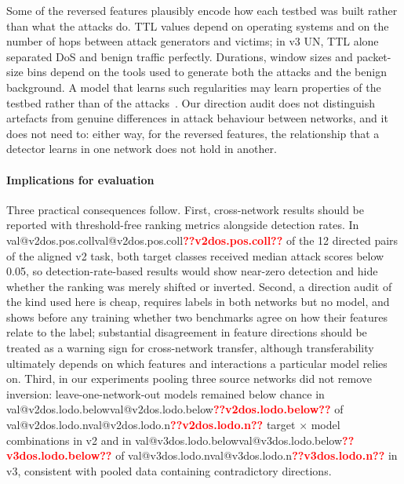 \documentclass[preprint,12pt]{elsarticle}
\makeatletter
\newcommand{\val}[1]{\ifcsname val@#1\endcsname\csname val@#1\endcsname\else\textbf{\textcolor{red}{??#1??}}\fi}
\newcommand{\net}[1]{\textsc{#1}}
\makeatother
\begin{document}
Some of the reversed features plausibly encode how each testbed was built rather than what the attacks do. TTL values depend on operating systems and on the number of hops between attack generators and victims; in v3 \net{UN}, TTL alone separated DoS and benign traffic perfectly. Durations, window sizes and packet-size bins depend on the tools used to generate both the attacks and the benign background. A model that learns such regularities may learn properties of the testbed rather than of the attacks~\cite{geirhos2020shortcut,arp2022dos}. Our direction audit does not distinguish artefacts from genuine differences in attack behaviour between networks, and it does not need to: either way, for the reversed features, the relationship that a detector learns in one network does not hold in another.

\paragraph{Implications for evaluation}
Three practical consequences follow. First, cross-network results should be reported with threshold-free ranking metrics alongside detection rates. In \val{v2dos.pos.coll} of the 12 directed pairs of the aligned v2 task, both target classes received median attack scores below 0.05, so detection-rate-based results would show near-zero detection and hide whether the ranking was merely shifted or inverted. Second, a direction audit of the kind used here is cheap, requires labels in both networks but no model, and shows before any training whether two benchmarks agree on how their features relate to the label; substantial disagreement in feature directions should be treated as a warning sign for cross-network transfer, although transferability ultimately depends on which features and interactions a particular model relies on. Third, in our experiments pooling three source networks did not remove inversion: leave-one-network-out models remained below chance in \val{v2dos.lodo.below} of \val{v2dos.lodo.n} target $\times$ model combinations in v2 and in \val{v3dos.lodo.below} of \val{v3dos.lodo.n} in v3, consistent with pooled data containing contradictory directions.
\end{document}
